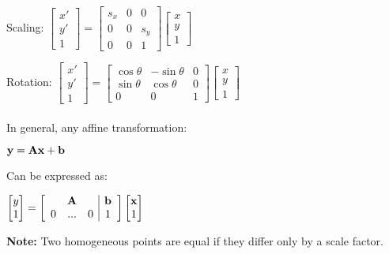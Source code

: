 \documentclass{article}
\begin{document}
Scaling: $\begin{bmatrix}x'\\y'\\1\end{bmatrix}
= \begin{bmatrix}s_x&0&0\\0&0&s_y\\0&0&1\end{bmatrix}
\begin{bmatrix}x\\y\\1\end{bmatrix}$

Rotation: $\begin{bmatrix}x'\\y'\\1\end{bmatrix}
=\begin{bmatrix}\cos\theta&-\sin\theta&0\\
		\sin\theta&\cos\theta&0\\
		0&0&1\end{bmatrix}
\begin{bmatrix} x\\y\\1	\end{bmatrix}$\\
\vspace{2.5mm}
\vspace{2.5mm}
\\
In general, any affine transformation:

\centerline{$\bf y = Ax + b$}

Can be expressed as:

\centerline{$ \begin{bmatrix}y\\1\end{bmatrix}=
	 \left[ \begin{array}{ccc|c}
	 &{\bf A}&& {\bf b} \\ 0&...&0&1
	\end{array} \right] 
	\begin{bmatrix}
	{\bf x}\\1
	\end{bmatrix}
$}

{\bf Note:} Two homogeneous points are equal if they differ only by a scale factor.
\end{document}
